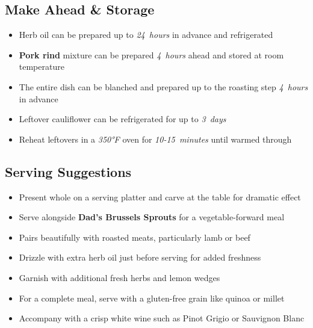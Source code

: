 \documentclass[11pt,letterpaper]{article}
\begin{document}
{\begin{multicols}{2}
\subsection*{Make Ahead \& Storage}
\begin{itemize}
    \item Herb oil can be prepared up to \textit{24~hours} in advance and refrigerated
    \item \textbf{Pork rind} mixture can be prepared \textit{4~hours} ahead and stored at room temperature
    \item The entire dish can be blanched and prepared up to the roasting step \textit{4~hours} in advance
    \item Leftover cauliflower can be refrigerated for up to \textit{3~days}
    \item Reheat leftovers in a \textit{350°F} oven for \textit{10-15~minutes} until warmed through
\end{itemize}

\subsection*{Serving Suggestions}
\begin{itemize}
    \item Present whole on a serving platter and carve at the table for dramatic effect
    \item Serve alongside \textbf{Dad's Brussels Sprouts} for a vegetable-forward meal
    \item Pairs beautifully with roasted meats, particularly lamb or beef
    \item Drizzle with extra herb oil just before serving for added freshness
    \item Garnish with additional fresh herbs and lemon wedges
    \item For a complete meal, serve with a gluten-free grain like quinoa or millet
    \item Accompany with a crisp white wine such as Pinot Grigio or Sauvignon Blanc
\end{itemize}

\end{multicols}
}
\end{document}
